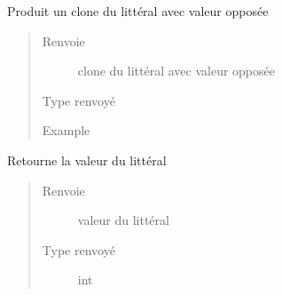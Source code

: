 \begin{fulllineitems}
\begin{fulllineitems}
\begin{quote}
\begin{description}
\end{description}\end{quote}

\end{fulllineitems}


\begin{fulllineitems}
\label{\detokenize{litteral:litteral.Litteral.negClone}}
Produit un clone du littéral avec valeur opposée
\begin{quote}\begin{description}
\item[{Renvoie}] \leavevmode
clone du littéral avec valeur opposée

\item[{Type renvoyé}] \leavevmode
{\hyperref[\detokenize{litteral:litteral.Litteral}]{}}

\item[{Example}] \leavevmode
\begin{sphinxVerbatim}[commandchars=\\\{\}]
\end{sphinxVerbatim}

\end{description}\end{quote}

\end{fulllineitems}


\begin{fulllineitems}
\label{\detokenize{litteral:litteral.Litteral.value}}
Retourne la valeur du littéral
\begin{quote}\begin{description}
\item[{Renvoie}] \leavevmode
valeur du littéral

\item[{Type renvoyé}] \leavevmode
int


\end{description}
\end{quote}
\end{fulllineitems}
\end{fulllineitems}
